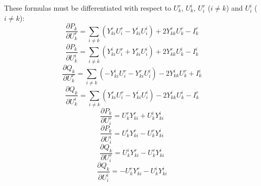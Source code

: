 These formulas must be differentiated with respect to $U_k^r$, $U_k^i$, $U_i^r$ ($i \ne k$) and $U_i^i$ ($i \ne k$):
\begin{equation}
	\frac{\partial P_k}{\partial U_k^r} = \sum_{i \ne k} \left( Y_{ki}^r U_i^r - Y_{ki}^i U_i^i \right) + 2 Y_{kk}^r U_k^r - I_k^r
\end{equation}
\begin{equation}
	\frac{\partial P_k}{\partial U_k^i} = \sum_{i \ne k} \left( Y_{ki}^i U_i^r + Y_{ki}^r U_i^i \right) + 2 Y_{kk}^r U_k^i - I_k^i
\end{equation}
\begin{equation}
	\frac{\partial Q_k}{\partial U_k^r} = \sum_{i \ne k} \left( - Y_{ki}^i U_i^r - Y_{ki}^r U_i^i \right) - 2 Y_{kk}^i U_k^r + I_k^i
\end{equation}
\begin{equation}
	\frac{\partial Q_k}{\partial U_k^i} = \sum_{i \ne k} \left( Y_{ki}^r U_i^r - Y_{ki}^i U_i^i \right) - 2 Y_{kk}^i U_k^i - I_k^r
\end{equation}
\begin{equation}
	\frac{\partial P_k}{\partial U_i^r} = U_k^r Y_{ki}^r + U_k^i Y_{ki}^i
\end{equation}
\begin{equation}
	\frac{\partial P_k}{\partial U_i^i} = U_k^i Y_{ki}^r - U_k^r Y_{ki}^i
\end{equation}
\begin{equation}
	\frac{\partial Q_k}{\partial U_i^r} = U_k^i Y_{ki}^r - U_k^r Y_{ki}^i
\end{equation}
\begin{equation}
	\frac{\partial Q_k}{\partial U_i^i} = - U_k^r Y_{ki}^r - U_k^i Y_{ki}^i
\end{equation}

